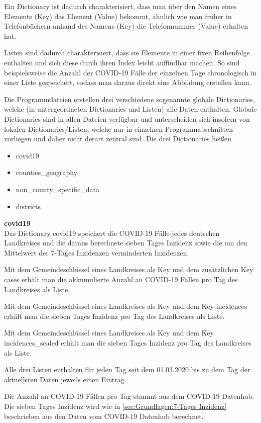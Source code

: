 Ein Dictionary ist dadurch charakterisiert, dass man über den Namen eines Elements (\glqq{}Key\grqq{}) das Element (\glqq{}Value\grqq{}) bekommt, ähnlich wie man früher in Telefonbüchern anhand des Namens (Key) die Telefonnummer (Value) erhalten hat.

Listen sind dadurch charakterisiert, dass sie Elemente in einer fixen Reihenfolge enthalten und sich diese durch ihren Index leicht auffindbar machen. So sind beispielsweise die Anzahl der COVID-19 Fälle der einzelnen Tage chronologisch in einer Liste gespeichert, sodass man daraus direkt eine Abbildung erstellen kann.


Die Programmdateien erstellen drei verschiedene sogenannte globale Dictionaries, welche (in untergeordneten Dictionaries und Listen) alle Daten enthalten. Globale Dictionaries sind in allen Dateien verfügbar und unterscheiden sich insofern von lokalen Dictionaries/Listen, welche nur in einzelnen Programmabschnitten vorliegen und daher nicht derart zentral sind.
Die drei Dictionaries heißen
\begin{itemize}
    \item covid19
    \item counties\_geography
    \item non\_county\_specific\_data
    \item districts
\end{itemize}

\textbf{covid19}\\
Das Dictionary covid19 speichert die COVID-19 Fälle jedes deutschen Landkreises und die daraus berechnete sieben Tages Inzidenz sowie die um den Mittelwert der 7-Tages Inzidenzen verminderten Inzidenzen.

Mit dem Gemeindeschlüssel eines Landkreises als Key und dem zusätzlichen Key \glqq{}cases\grqq{} erhält man die akkumulierte Anzahl an COVID-19 Fällen pro Tag des Landkreises als Liste.

Mit dem Gemeindeschlüssel eines Landkreises als Key und dem Key \glqq{}incidences\grqq{} erhält man die sieben Tages Inzidenz pro Tag des Landkreises als Liste.

Mit dem Gemeindeschlüssel eines Landkreises als Key und dem Key \glqq{}incidences\_scaled\grqq{} erhält man die sieben Tages Inzidenz pro Tag des Landkreises als Liste.

Alle drei Listen enthalten für jeden Tag seit dem 01.03.2020 bis zu dem Tag der aktuellsten Daten jeweils einen Eintrag.

Die Anzahl an COVID-19 Fällen pro Tag stammt aus dem \glqq{}COVID-19 Datenhub\grqq{}. Die sieben Tages Inzidenz wird wie in \autoref{sec:Grundlagen:7-Tages Inzidenz} beschrieben aus den Daten vom COVID-19 Datenhub berechnet.

